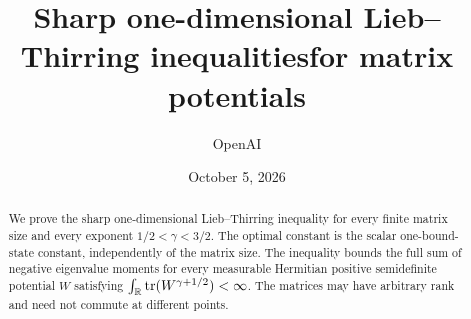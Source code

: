 \documentclass[11pt]{article}
\title{Sharp one-dimensional Lieb--Thirring inequalities\newline for matrix potentials}
\author{OpenAI}
\date{October 5, 2026}
\begin{document}
\maketitle
\begin{abstract}
We prove the sharp one-dimensional Lieb--Thirring inequality for every finite
matrix size and every exponent $1/2<\gamma<3/2$. The optimal constant is the
scalar one-bound-state constant, independently of the matrix size. The
inequality bounds the full sum of negative eigenvalue moments for every
measurable Hermitian positive semidefinite potential $W$ satisfying
$\int_\mathbb R\operatorname{tr}(W^{\gamma+1/2})<\infty$. The matrices may have arbitrary rank and
need not commute at different points.
\end{abstract}
\tableofcontents








\end{document}
